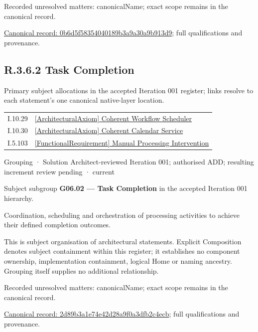 {\small Recorded unresolved matters: canonicalName; exact scope remains in the canonical record.}\par
{\footnotesize \href{../../../../continuum/grouping/0b6d5f58354040189b3a9a30a9b913d9.md}{Canonical record: 0b6d5f58354040189b3a9a30a9b913d9}; full qualifications and provenance.}\par
\subsection*{R.3.6.2 Task Completion}
\label{navigation:R.3.6.2}

Primary subject allocations in the accepted Iteration 001 register; links resolve to each statement’s one canonical native-layer location.\par
\begin{longtable}{p{.22\linewidth}p{.73\linewidth}}
I.10.29 & \hyperref[element:99adfc9b5af049748df91755d395c247]{[ArchitecturalAxiom] Coherent Workflow Scheduler} \\
I.10.30 & \hyperref[element:a9b1d031fa844057aa030f09e4fa6b01]{[ArchitecturalAxiom] Coherent Calendar Service} \\
I.5.103 & \hyperref[element:911511665a8a4135b7f2a37f5f79ad36]{[FunctionalRequirement] Manual Processing Intervention} \\
\end{longtable}
\label{element:2d89b3a1e74e42d28a9f0a3dfb2c4ecb}
{\small Grouping · Solution Architect-reviewed Iteration 001; authorised ADD; resulting increment review pending · current}\par

Subject subgroup \textbf{G06.02 — Task Completion} in the accepted Iteration 001 hierarchy.



Coordination, scheduling and orchestration of processing activities to achieve their defined completion outcomes.



This is subject organisation of architectural statements. Explicit Composition denotes subject containment within this register; it establishes no component ownership, implementation containment, logical Home or naming ancestry. Grouping itself supplies no additional relationship.


{\small Recorded unresolved matters: canonicalName; exact scope remains in the canonical record.}\par
{\footnotesize \href{../../../../continuum/grouping/2d89b3a1e74e42d28a9f0a3dfb2c4ecb.md}{Canonical record: 2d89b3a1e74e42d28a9f0a3dfb2c4ecb}; full qualifications and provenance.}\par
